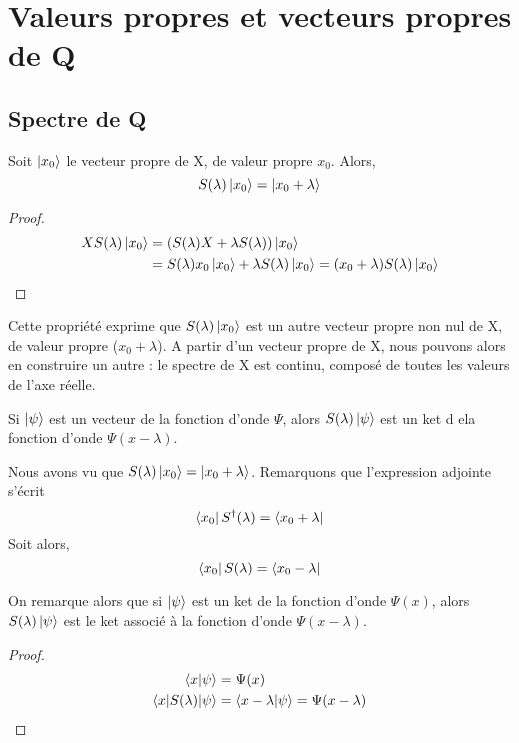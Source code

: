 \documentclass[../Notesdecours.tex]{subfiles}
\begin{document}
\section{Valeurs propres et vecteurs propres de Q}
\subsection{Spectre de Q}

\begin{Property}
	Soit $\ket{x_0}$ le vecteur propre de X, de valeur propre $x_0$. Alors,
	\begin{equation}
		S(\lambda)\ket{x_0} = \ket{x_0+\lambda}
	\end{equation}
\end{Property}
\begin{proof}
	\begin{align*}
		XS(\lambda)\ket{x_0} &= (S(\lambda)X+\lambda S(\lambda))\ket{x_0}\\
		&= S(\lambda)x_0\ket{x_0} + \lambda S(\lambda)\ket{x_0} = (x_0+\lambda)S(\lambda)\ket{x_0}
	\end{align*}
\end{proof}

Cette propriété exprime que $S(\lambda)\ket{x_0}$ est un autre vecteur propre non nul de X, de valeur propre ($x_0+\lambda$). A partir d'un vecteur propre de X, nous pouvons alors en construire un autre : le spectre de X est continu, composé de toutes les valeurs de l'axe réelle.

\begin{Property}
	Si $\ket{\psi}$ est un vecteur de la fonction d'onde $\Psi$, alors $S(\lambda)\ket{\psi}$ est un ket d ela fonction d'onde $\Psi(x-\lambda)$.
\end{Property}

\begin{remark}
	Nous avons vu que $S(\lambda)\ket{x_0} = \ket{x_0+\lambda}$. Remarquons que l'expression adjointe s'écrit
	\begin{equation}
		\bra{x_0}S^\dagger (\lambda) = \bra{x_0+\lambda}
	\end{equation}
	Soit alors,
	\begin{equation}
		\bra{x_0}S(\lambda) = \bra{x_0-\lambda}
	\end{equation}
\end{remark}

\begin{Property}
	On remarque alors que si $\ket{\psi}$ est un ket de la fonction d'onde $\Psi(x)$, alors $S(\lambda)\ket{\psi}$ est le ket associé à la fonction d'onde $\Psi(x-\lambda)$.
\end{Property}
\begin{proof}
	\begin{align*}
		\braket{x|\psi} &= \Psi(x)\\
		\braket{x|S(\lambda)|\psi} &= \braket{x-\lambda|\psi} = \Psi(x-\lambda)
	\end{align*}
\end{proof}
\end{document}
